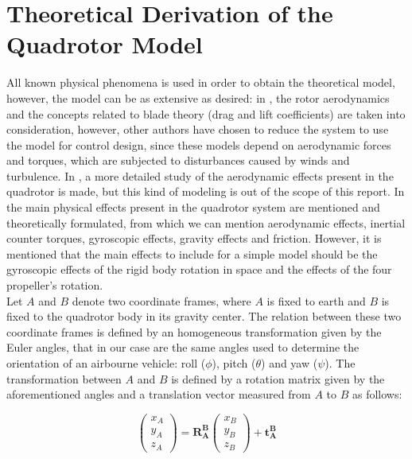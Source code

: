\section{Theoretical Derivation of the Quadrotor Model}

All known physical phenomena is used in order to obtain the theoretical model, however, the model can be as extensive as desired: in \cite{MahoneyKumarCorke2012}, the rotor aerodynamics and the concepts related to blade theory (drag and lift coefficients) are taken into consideration, however, other authors have chosen to reduce the system to use the model for control design, since these models depend on aerodynamic forces and torques, which are subjected to disturbances caused by winds and turbulence. In \cite{HoffmannetAl2007}, a more detailed study of the aerodynamic effects present in the quadrotor is made, but this kind of modeling is out of the scope of this report. In \cite{BouabdallahetAl} the main physical effects present in the quadrotor system are mentioned and theoretically formulated, from which we can mention aerodynamic effects, inertial counter torques, gyroscopic effects, gravity effects and friction. However, it is mentioned that the main effects to include for a simple model should be the gyroscopic effects of the rigid body rotation in space and the effects of the four propeller's rotation. \\

Let {$A$} and {$B$} denote two coordinate frames, where {$A$} is fixed to earth and {$B$} is fixed to the quadrotor body in its gravity center. The relation between these two coordinate frames is defined by an homogeneous transformation given by the Euler angles, that in our case are the same angles used to determine the orientation of an airbourne vehicle: roll ($\phi$), pitch ($\theta$) and yaw ($\psi$). The transformation between {$A$} and {$B$} is defined by a rotation matrix given by the aforementioned angles and a translation vector measured from {$A$} to {$B$} as follows: 

\begin{equation} \label{eq:transformation}
\begin{pmatrix} x_A \\
				y_A \\
				z_A \end{pmatrix} = \mathbf{R_{A}^{B}}\begin{pmatrix} x_B \\
															  y_B \\
															  z_B \end{pmatrix} + \mathbf{t_{A}^{B}} 
\end{equation}

